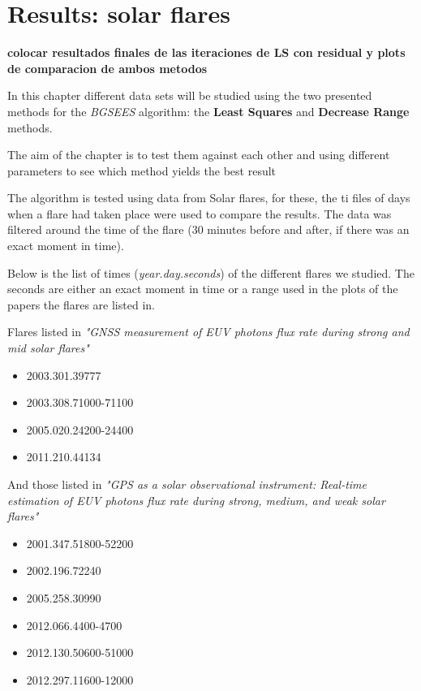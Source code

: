 \chapter{Results: solar flares}

\textbf{colocar resultados finales de las iteraciones de LS con residual y plots de comparacion de ambos metodos}

In this chapter different data sets will be studied using the two presented methods for the \textit{BGSEES} algorithm: the \textbf{Least Squares} and \textbf{Decrease Range} methods. 

The aim of the chapter is to test them against each other and using different parameters to see which method yields the best result

The algorithm is tested using data from Solar flares, for these, the ti files of days when a flare had taken place were used to compare the results. The data was filtered around the time of the flare (30 minutes before and after, if there was an exact moment in time).
 
Below is the list of times (\textit{year.day.seconds}) of the different flares we studied. The seconds are either an exact moment in time or a range used in the plots of the papers the flares are listed in.

Flares listed in \textit{"GNSS measurement of EUV photons flux rate during strong and mid solar flares"}\cite{hernandez2012gnss}

\begin{itemize}
	\item 2003.301.39777
	\item 2003.308.71000-71100
	\item 2005.020.24200-24400
	\item 2011.210.44134
\end{itemize}

And those listed in \textit{"GPS as a solar observational instrument: Real-time estimation of EUV photons flux rate during strong, medium, and weak solar flares"}\cite{singh2015gps}

\begin{itemize}
	\item 2001.347.51800-52200
	\item 2002.196.72240
	\item 2005.258.30990
	\item 2012.066.4400-4700
	\item 2012.130.50600-51000
	\item 2012.297.11600-12000
\end{itemize}

